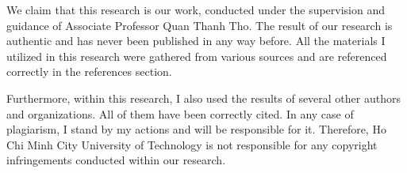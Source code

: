 \documentclass[12pt,a4paper,oneside]{book} %
\begin{document}

\coverpage

\frontmatter


\begin{declaration}




We claim that this research is our work, conducted under the supervision and guidance of Associate Professor Quan Thanh Tho. The result of our research is authentic and has never been published in any way before. All the materials I utilized in this research were gathered from various sources and are referenced correctly in the references section. 

Furthermore, within this research, I also used the results of several other authors and organizations. All of them have been correctly cited. In any case of plagiarism, I stand by my actions and will be responsible for it. Therefore, Ho Chi Minh City University of Technology is not responsible for any copyright infringements conducted within our research.

\end{declaration}
\end{document}
